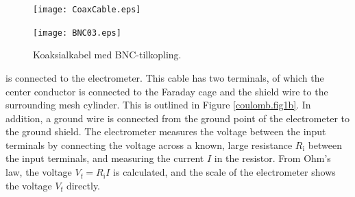 \documentclass[../Elmag-labhefte-2022.tex]{subfiles}
\begin{document}
\begin{figure}[!h]
    \begin{minipage}[b]{0.5\linewidth}
        \centering
        \texttt{[image: CoaxCable.eps]}
        \caption{%
            Tverrsnitt av en koaksialkabel.
        }
        \label{fig:CoaxCable}
    \end{minipage}
    \hspace{0.15cm}
    \begin{minipage}[b]{0.5\linewidth}
        \centering
        \texttt{[image: BNC03.eps]}
        \caption{%
            Koaksialkabel med BNC-tilkopling.
        }
        \label{fig:BNC03}
    \end{minipage}
\end{figure}
is connected to the electrometer. This cable has two terminals, of which the center conductor is connected to the Faraday cage and the shield wire to the surrounding mesh cylinder. This is outlined in Figure \ref{coulomb.fig1b}. In addition, a ground wire is connected from the ground point of the electrometer to the ground shield. The electrometer measures the voltage between the input terminals by connecting the voltage across a known, large resistance $R_\text{i}$ between the input terminals, and measuring the current $I$ in the resistor. From Ohm's law, the voltage $V_\text{f} = R_\text{i}  I$ is calculated, and the scale of the electrometer shows the voltage $V_\text{f}$ directly.
\end{document}
